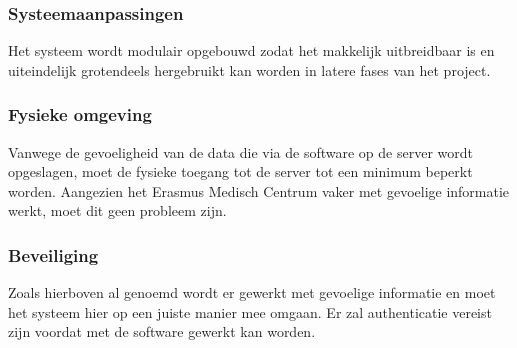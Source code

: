 \subsubsection{Systeemaanpassingen}
Het systeem wordt modulair opgebouwd zodat het makkelijk uitbreidbaar is en uiteindelijk grotendeels hergebruikt kan worden in latere fases van het project.

\subsubsection{Fysieke omgeving}
Vanwege de gevoeligheid van de data die via de software op de server wordt opgeslagen, moet de fysieke toegang tot de server tot een minimum beperkt worden. Aangezien het Erasmus Medisch Centrum vaker met gevoelige informatie werkt, moet dit geen probleem zijn.

\subsubsection{Beveiliging}
Zoals hierboven al genoemd wordt er gewerkt met gevoelige informatie en moet het systeem hier op een juiste manier mee omgaan. 
Er zal authenticatie vereist zijn voordat met de software gewerkt kan worden.
